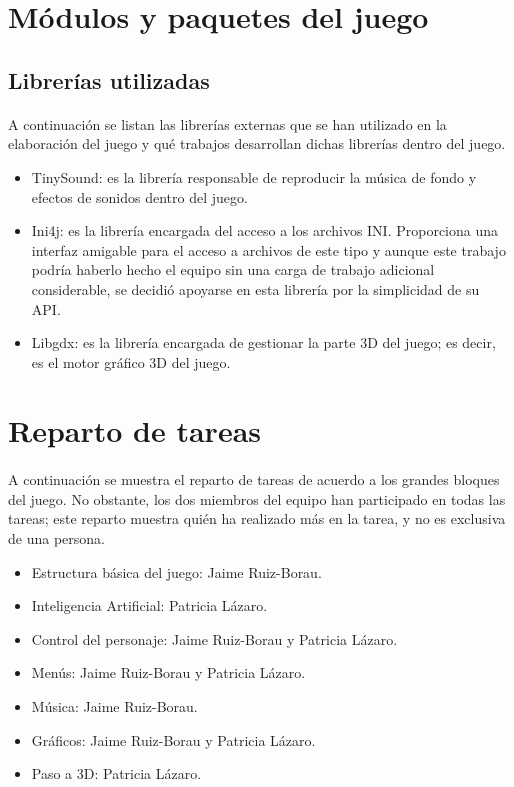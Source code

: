 \documentclass[a4paper]{article}
\begin{document}
\section{Módulos y paquetes del juego}

\subsection{Librerías utilizadas}

\paragraph{}A continuación se listan las librerías externas que se han utilizado en la elaboración del juego y qué trabajos desarrollan dichas librerías dentro del juego.

\begin{itemize}
\item TinySound: es la librería responsable de reproducir la música de fondo y efectos de sonidos dentro del juego.

\item Ini4j: es la librería encargada del acceso a los archivos INI. Proporciona una interfaz amigable para el acceso a archivos de este tipo y aunque este trabajo podría haberlo hecho el equipo sin una carga de trabajo adicional considerable, se decidió apoyarse en esta librería por la simplicidad de su API.

\item Libgdx: es la librería encargada de gestionar la parte 3D del juego; es decir, es el motor gráfico 3D del juego.
\end{itemize}
\newpage

\section{Reparto de tareas}

\paragraph{}A continuación se muestra el reparto de tareas de acuerdo a los grandes bloques del juego. No obstante, los dos miembros del equipo han participado en todas las tareas; este reparto muestra quién ha realizado más en la tarea, y no es exclusiva de una persona.

\begin{itemize}
\item Estructura básica del juego: Jaime Ruiz-Borau.
\item Inteligencia Artificial: Patricia Lázaro.
\item Control del personaje: Jaime Ruiz-Borau y Patricia Lázaro.
\item Menús: Jaime Ruiz-Borau y Patricia Lázaro.
\item Música: Jaime Ruiz-Borau.
\item Gráficos: Jaime Ruiz-Borau y Patricia Lázaro.
\item Paso a 3D: Patricia Lázaro.
\end{itemize}
\newpage
\end{document}
